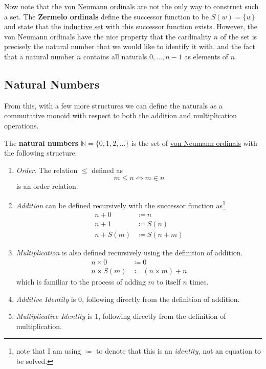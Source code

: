   Now note that the \hyperref[def:von-neumann-ordinals]{von Neumann ordinals} are not the only way to construct such a set. The \textbf{Zermelo ordinals} define the successor function to be $S(w) = \{w\}$ and state that the \hyperref[def:inductive-set]{inductive set} with this successor function exists. However, the von Neumann ordinals have the nice property that the cardinality $n$ of the set is precisely the natural number that we would like to identify it with, and the fact that a natural number $n$ contains all naturals $0, \ldots, n-1$ as elements of $n$. 

\subsection{Natural Numbers}

  From this, with a few more structures we can define the naturals as a commutative \hyperref[def:monoid]{monoid} with respect to both the addition and multiplication operations.

  \begin{definition}
    \label{def:naturals}
    The \textbf{natural numbers} $\mathbb{N} = \{0, 1, 2, \ldots\}$ is the set of \hyperref[def:von-neumann-ordinals]{von Neumann ordinals} with the following structure. 
    \begin{enumerate}
      \item \textit{Order}. The relation $\leq$ defined as 
      \begin{equation}
        m \leq n \iff m \in n
      \end{equation}
      is an order relation. 

      \item \textit{Addition} can be defined recursively with the successor function as\footnote{note that I am using $\coloneqq$ to denote that this is an \textit{identity}, not an equation to be solved.}
      \begin{align}
        n + 0 & \coloneqq n \\
        n + 1 & \coloneqq S(n) \\  
        n + S(m) & \coloneqq S(n + m)
      \end{align}

      \item \textit{Multiplication} is also defined recursively using the definition of addition.  
      \begin{align}
        n \times 0 & \coloneqq 0 \\
        n \times S(m) & \coloneqq (n \times m) + n
      \end{align}
      which is familiar to the process of adding $m$ to itself $n$ times. 

      \item \textit{Additive Identity} is $0$, following directly from the definition of addition. 
      \item \textit{Multiplicative Identity} is $1$, following directly from the definition of multiplication. 
    \end{enumerate}
  \end{definition} 

